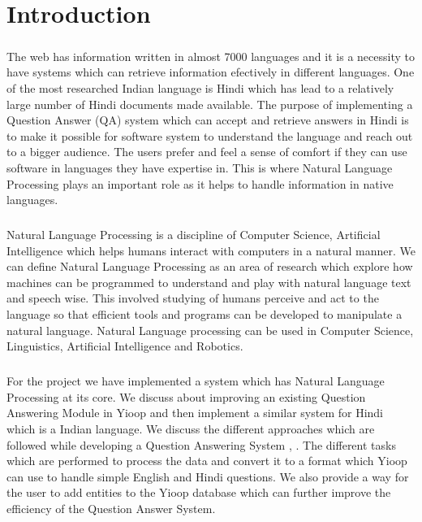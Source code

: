 \chapter{Introduction}

\paragraph{}
The web has information written in almost 7000 languages and it is a necessity to have systems which can retrieve information efectively in different languages. One of the most researched Indian language is Hindi which has lead to a relatively large number of Hindi documents made available. The purpose of implementing a Question Answer (QA) system which can accept and retrieve answers in Hindi is to make it possible for software system to understand the language and reach out to a bigger audience. The users prefer and feel a sense of comfort if they can use software in languages they have expertise in. This is where Natural Language Processing \cite{chowdhury2003natural} plays an important role as it helps to handle information in native languages.

\paragraph{}
Natural Language Processing is a discipline of Computer Science, Artificial Intelligence which helps humans interact with computers in a natural manner. We can define Natural Language Processing as an area of research which explore how machines can be programmed to understand and play with natural language text and speech wise. This involved studying of humans perceive and act to the language so that efficient tools and programs can be developed to manipulate a natural language. Natural Language processing can be used in Computer Science, Linguistics, Artificial Intelligence and Robotics. 

\paragraph{}
For the project we have implemented a system which has Natural Language Processing at its core. We discuss about improving an existing Question Answering Module \cite {patel2015question} in Yioop and then implement a similar system for Hindi which is a Indian language. We discuss the different approaches which are followed while developing a Question Answering System \cite {simmons1970natural}, \cite{waltz1978english}. The different tasks which are performed to process the data and convert it to a format which Yioop can use to handle simple English and Hindi questions. We also provide a way for the user to add entities to the Yioop database which can further improve the efficiency of the Question Answer System.
